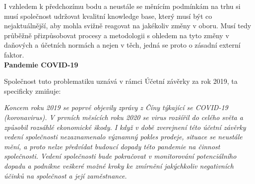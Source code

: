 \vspace*{-1mm}

I vzhledem k předchozímu bodu a neustále se měnícím podmínkám na trhu si musí společnost udržovat kvalitní knowledge base, který musí být co nejaktuálnější, aby mohla svižně reagovat na jakékoliv změny v oboru. Musí tedy průběžně přizpůsobovat procesy a metodologii s ohledem na tyto změny v daňových a účetních normách a nejen v těch, jedná se proto o zásadní externí faktor.\\





%




 
\textbf{Pandemie COVID-19}\\

\vspace*{-1mm}

Společnost tuto problematiku uznává v rámci Účetní závěrky za rok 2019, ta specificky zmiňuje:\\

\vspace*{-1mm}

\textit{Koncem roku 2019 se poprvé objevily zprávy z Číny týkající se COVID-19 (koronavirus). V prvních měsících roku 2020 se virus rozšířil do celého světa a způsobil rozsáhlé ekonomické škody. I když v době zverejnení této účetní závěrky vedení společnosti nezaznamenalo významný pokles prodeje, situace se neustále mění, a proto nelze předvídat budoucí dopady této pandemie na činnost společnosti. Vedení společnosti bude pokračovat v monitorování potenciálního dopadu a podnikne veškeré možné kroky ke zmírnění jakýchkoliv negativních účinků na společnost a její zaměstnance.}

